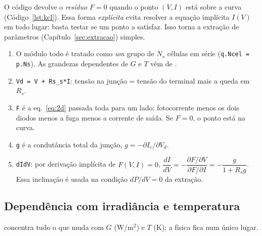 O c\'odigo devolve o \emph{res\'iduo} $F=0$ quando o ponto $(V,I)$ est\'a sobre a curva
(C\'odigo~\ref{lst:kcl}). Essa forma \emph{expl\'icita} evita resolver a equa\c{c}\~ao impl\'icita
$I(V)$ em todo lugar: basta testar se um ponto a satisfaz. Isso torna a extra\c{c}\~ao de
par\^ametros (Cap\'itulo~\ref{sec:extracao}) simples.


\begin{logica}
\begin{enumerate}
\item O m\'odulo todo \'e tratado como \emph{um} grupo de $N_s$ c\'elulas em s\'erie
 (\texttt{q.Ncel = p.Ns}). As grandezas dependentes de $G$ e $T$ v\^em de .
\item \texttt{Vd = V + Rs\_s*I}: tens\~ao na jun\c{c}\~ao = tens\~ao do terminal mais a queda em $R_s$.
\item \texttt{F} \'e a eq.~\eqref{eq:2d} passada toda para um lado: fotocorrente menos os dois
 diodos menos a fuga menos a corrente de sa\'ida. Se $F=0$, o ponto est\'a na curva.
\item \texttt{g} \'e a condut\^ancia total da jun\c{c}\~ao, $g=-\partial I_c/\partial V_d$.
\item \texttt{dIdV}: por deriva\c{c}\~ao impl\'icita de $F(V,I)=0$,
 $\dfrac{dI}{dV}=-\dfrac{\partial F/\partial V}{\partial F/\partial I}=-\dfrac{g}{1+R_sg}$.
 Essa inclina\c{c}\~ao \'e usada na condi\c{c}\~ao $dP/dV=0$ da extra\c{c}\~ao.
\end{enumerate}
\end{logica}

\subsection{Depend\^encia com irradi\^ancia e temperatura}

 concentra tudo o que muda com $G$ (W/m$^2$) e $T$ (K); a f\'isica fica
num \'unico lugar.


